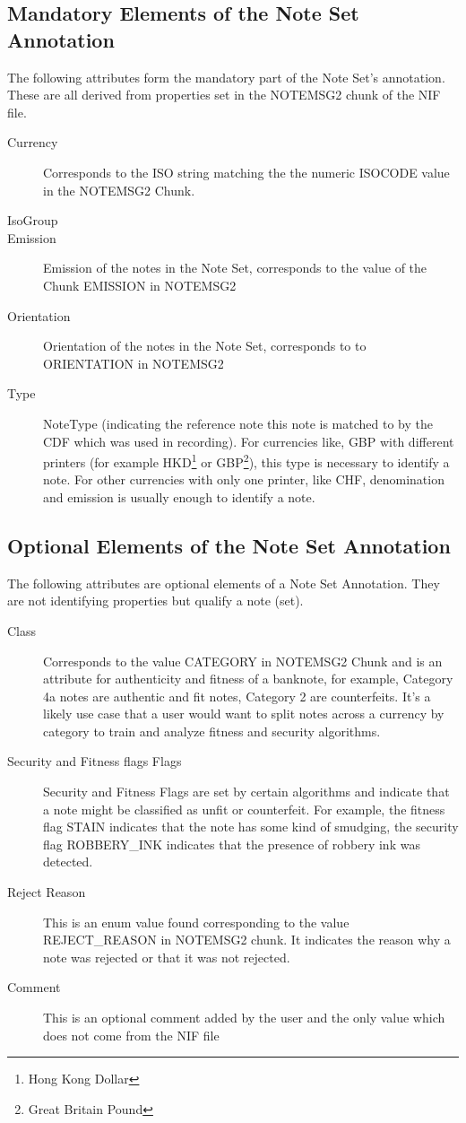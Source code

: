 \subsection{Mandatory Elements of the Note Set Annotation}
The following attributes form the mandatory part of the Note Set's annotation. These are all derived from properties set in the NOTEMSG2 chunk of the NIF file. 
\begin{description}
  \item[Currency] Corresponds to the ISO string matching the the numeric ISOCODE value in the NOTEMSG2 Chunk.
  \item[IsoGroup] 
  \item[Emission] Emission of the notes in the Note Set, corresponds to the value of the Chunk EMISSION in NOTEMSG2
  \item[Orientation] Orientation of the notes in the Note Set, corresponds to to ORIENTATION in NOTEMSG2
\item[Type] NoteType (indicating the reference note this note is matched to by the CDF which was used in recording). For currencies like, GBP with different printers (for example HKD\footnote{Hong Kong Dollar} or GBP\footnote{Great Britain Pound}), this type is necessary to identify a note. For other currencies with only one printer, like CHF, denomination and emission is usually enough to identify a note.
\end{description}

\subsection{Optional Elements of the Note Set Annotation}
The following attributes are optional elements of a Note Set Annotation. They are not identifying properties but qualify a note (set).

\begin{description}
\item[Class] Corresponds to the value CATEGORY in NOTEMSG2 Chunk and is an attribute for authenticity and fitness of a banknote, for example, Category 4a notes are authentic and fit notes, Category 2 are counterfeits. It's a likely use case that a user would want to split notes across a currency by category to train and analyze fitness and security algorithms. 
\item[Security and Fitness flags Flags] Security and Fitness Flags are set by certain algorithms and indicate that a note might be classified as unfit or counterfeit. For example, the fitness flag STAIN indicates that the note has some kind of smudging, the security flag ROBBERY\_INK indicates that the presence of robbery ink was detected. 
\item[Reject Reason] This is an enum value found corresponding to the value REJECT\_REASON in NOTEMSG2 chunk. It indicates the reason why a note was rejected or that it was not rejected.
\item [Comment] This is an optional comment added by the user and the only value which does not come from the NIF file
\end{description}

